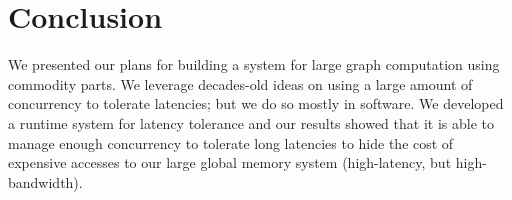 \documentclass[10pt,nocopyrightspace]{sigplanconf}
\begin{document}
\section{Conclusion}
\label{sec:conclusion}

We presented our plans for building a system for large graph
computation using commodity parts. We leverage decades-old ideas on
using a large amount of concurrency to tolerate latencies; but we do so
mostly in software. We developed a runtime system for latency
tolerance and our results showed that it is able to manage enough
concurrency to tolerate long latencies to hide the cost of
expensive accesses to our large global memory system (high-latency,
but high-bandwidth).


{\small

}
\end{document}
